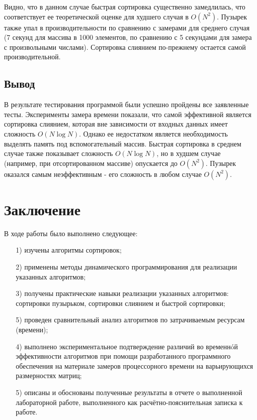 \documentclass[a4paper,12pt]{article}
\begin{document}
		Видно, что в данном случае быстрая сортировка существенно замедлилась, что соответствует ее теоретической оценке для худшего случая в $O(N^2)$. Пузырек   также упал в производительности по сравнению с замерами для среднего случая (7 секунд для массива в 1000 элементов, по сравнению с 5 секундами для замера с произвольными числами). Сортировка слиянием по-прежнему остается самой производительной.
		
	
        
       \subsection*{Вывод}
       В результате тестирования программой были успешно пройдены все заявленные тесты. Эксперименты замера времени показали, что самой эффективной является сортировка слиянием, которая вне зависимости от входных данных имеет сложность $O(N \log N)$. Однако ее недостатком является необходимость выделять память под вспомогательный массив. Быстрая сортировка в среднем случае также показывает сложность $O(N \log N)$, но в худшем случае (например, при отсортированном массиве) опускается до $O(N^2)$. Пузырек оказался самым неэффективным - его сложность в любом случае $O(N^2)$.
        
    

\pagebreak
\section*{Заключение}
	В ходе работы было выполнено следующее:
	\begin{enumerate}
	\item[1)] изучены алгоритмы сортировок;
	\item[2)] применены методы динамического программирования для  
	реализации указанных алгоритмов;
	\item[3)] получены практические навыки реализации указанных алгоритмов: сортировки пузырьком, сортировки слиянием и быстрой сортировки;
	\item[5)] проведен сравнительный анализ алгоритмов по затрачиваемым ресурсам (времени);
	\item[4)] выполнено экспериментальное подтверждение различий во временнóй эффективности алгоритмов при помощи разработанного программного обеспечения на материале замеров процессорного времени на варьирующихся размерностях матриц;
	\item[5)] описаны и обоснованы полученные результаты в отчете о выполненной лабораторной работе, выполненного как расчётно-пояснительная записка к работе. 
	\end{enumerate}
	
\end{document}
